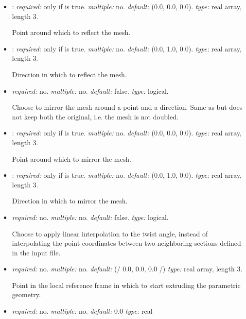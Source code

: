 \begin{itemize}
\item {}: \textit{required:} only if  is true. \textit{multiple:} no. \textit{default:} (0.0, 0.0, 0.0). \textit{type:} real array, length 3.

Point around which to reflect the mesh.

\item {}: \textit{required:} only if  is true. \textit{multiple:} no. \textit{default:} (0.0, 1.0, 0.0). \textit{type:} real array, length 3.

Direction in which to reflect the mesh.

\item {} \textit{required:} no. \textit{multiple:} no. \textit{default:} false. \textit{type:} logical.

Choose to mirror the mesh around a point and a direction. Same as  but does not keep both the original, i.e. the mesh is not doubled.

\item {}:  \textit{required:} only if  is true. \textit{multiple:} no. \textit{default:} (0.0, 0.0, 0.0). \textit{type:} real array, length 3.

Point around which to mirror the mesh.

\item {}: \textit{required:} only if  is true. \textit{multiple:} no. \textit{default:} (0.0, 1.0, 0.0). \textit{type:} real array, length 3.

Direction in which to mirror the mesh.

\item {} \textit{required:} no. \textit{multiple:} no. \textit{default:} false. \textit{type:} logical.

Choose to apply linear interpolation to the twist angle, instead of interpolating the point coordinates between two neighboring sections defined in the input file.

\item {} \textit{required:} no. \textit{multiple:} no. \textit{default:} (/ 0.0, 0.0, 0.0 /) \textit{type:} real array, length 3.

Point in the local reference frame in which to start extruding the parametric geometry.

\item {} \textit{required:} no. \textit{multiple:} no. \textit{default:} 0.0 \textit{type:} real


\end{itemize}
